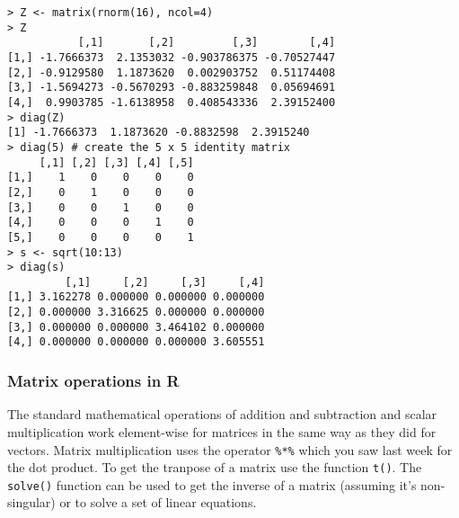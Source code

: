 \documentclass{article}
\begin{document}
\begin{lstlisting}
> Z <- matrix(rnorm(16), ncol=4)
> Z
           [,1]       [,2]         [,3]        [,4]
[1,] -1.7666373  2.1353032 -0.903786375 -0.70527447
[2,] -0.9129580  1.1873620  0.002903752  0.51174408
[3,] -1.5694273 -0.5670293 -0.883259848  0.05694691
[4,]  0.9903785 -1.6138958  0.408543336  2.39152400
> diag(Z)
[1] -1.7666373  1.1873620 -0.8832598  2.3915240
> diag(5) # create the 5 x 5 identity matrix
     [,1] [,2] [,3] [,4] [,5]
[1,]    1    0    0    0    0
[2,]    0    1    0    0    0
[3,]    0    0    1    0    0
[4,]    0    0    0    1    0
[5,]    0    0    0    0    1
> s <- sqrt(10:13)
> diag(s)
         [,1]     [,2]     [,3]     [,4]
[1,] 3.162278 0.000000 0.000000 0.000000
[2,] 0.000000 3.316625 0.000000 0.000000
[3,] 0.000000 0.000000 3.464102 0.000000
[4,] 0.000000 0.000000 0.000000 3.605551
\end{lstlisting}
\subsubsection{Matrix operations in R}

The standard mathematical operations of addition and subtraction and
scalar multiplication work element-wise for matrices in the same way as
they did for vectors. Matrix multiplication uses the operator
\lstinline!%*%! which you saw last week for the dot product. To get the
tranpose of a matrix use the function \lstinline!t()!. The
\lstinline!solve()! function can be used to get the inverse of a matrix
(assuming it's non-singular) or to solve a set of linear equations.
\end{document}
